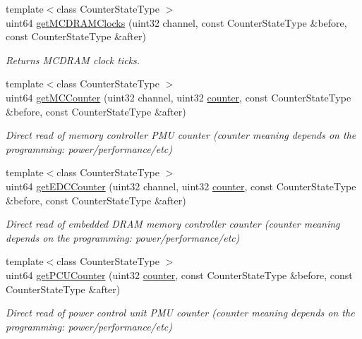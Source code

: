 \begin{DoxyCompactItemize}
{\footnotesize template$<$class Counter\+State\+Type $>$ }\\uint64 \mbox{\hyperlink{class_server_uncore_power_state_a1615063ac14cde3ace1a91bfb349f3f9}{get\+M\+C\+D\+R\+A\+M\+Clocks}} (uint32 channel, const Counter\+State\+Type \&before, const Counter\+State\+Type \&after)
\begin{DoxyCompactList}\small\item\em Returns M\+C\+D\+R\+AM clock ticks. \end{DoxyCompactList}\item 
{\footnotesize template$<$class Counter\+State\+Type $>$ }\\uint64 \mbox{\hyperlink{class_server_uncore_power_state_aed082cc97dbad35e1633823e582afa0f}{get\+M\+C\+Counter}} (uint32 channel, uint32 \mbox{\hyperlink{structcounter}{counter}}, const Counter\+State\+Type \&before, const Counter\+State\+Type \&after)
\begin{DoxyCompactList}\small\item\em Direct read of memory controller P\+MU counter (counter meaning depends on the programming\+: power/performance/etc) \end{DoxyCompactList}\item 
{\footnotesize template$<$class Counter\+State\+Type $>$ }\\uint64 \mbox{\hyperlink{class_server_uncore_power_state_a996fd8a127111e06540302cf9ccb24a7}{get\+E\+D\+C\+Counter}} (uint32 channel, uint32 \mbox{\hyperlink{structcounter}{counter}}, const Counter\+State\+Type \&before, const Counter\+State\+Type \&after)
\begin{DoxyCompactList}\small\item\em Direct read of embedded D\+R\+AM memory controller counter (counter meaning depends on the programming\+: power/performance/etc) \end{DoxyCompactList}\item 
{\footnotesize template$<$class Counter\+State\+Type $>$ }\\uint64 \mbox{\hyperlink{class_server_uncore_power_state_a3c424ad42d2439410d6ffc371335573d}{get\+P\+C\+U\+Counter}} (uint32 \mbox{\hyperlink{structcounter}{counter}}, const Counter\+State\+Type \&before, const Counter\+State\+Type \&after)
\begin{DoxyCompactList}\small\item\em Direct read of power control unit P\+MU counter (counter meaning depends on the programming\+: power/performance/etc) \end{DoxyCompactList}\item 

\end{DoxyCompactItemize}
